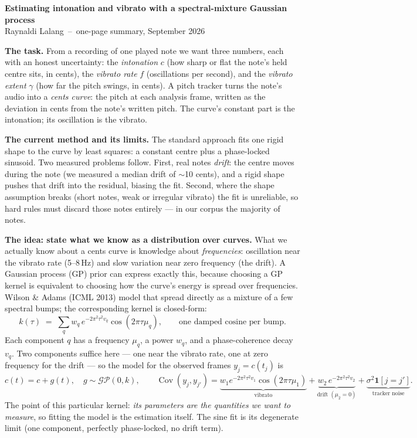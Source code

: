 \documentclass[10pt,a4paper]{article}
\begin{document}
\begin{center}
{\large\bfseries Estimating intonation and vibrato with a spectral-mixture Gaussian process}\\[2pt]
{\small Raynaldi Lalang \,--\, one-page summary, September 2026}
\end{center}

\textbf{The task.}
From a recording of one played note we want three numbers, each with an honest
uncertainty: the \emph{intonation} $c$ (how sharp or flat the note's held centre
sits, in cents), the \emph{vibrato rate} $f$ (oscillations per second), and the
\emph{vibrato extent} $\gamma$ (how far the pitch swings, in cents). A pitch
tracker turns the note's audio into a \emph{cents curve}: the pitch at each
analysis frame, written as the deviation in cents from the note's written pitch.
The curve's constant part is the intonation; its oscillation is the vibrato.

\textbf{The current method and its limits.}
The standard approach fits one rigid shape to the curve by least squares: a
constant centre plus a phase-locked sinusoid. Two measured problems follow.
First, real notes \emph{drift}: the centre moves during the note (we measured a
median drift of $\sim$10 cents), and a rigid shape pushes that drift into the
residual, biasing the fit. Second, where the shape assumption breaks (short
notes, weak or irregular vibrato) the fit is unreliable, so hard rules must
discard those notes entirely --- in our corpus the majority of notes.

\textbf{The idea: state what we know as a distribution over curves.}
What we actually know about a cents curve is knowledge about \emph{frequencies}:
oscillation near the vibrato rate (5--8\,Hz) and slow variation near zero
frequency (the drift). A Gaussian process (GP) prior can express exactly this,
because choosing a GP kernel is equivalent to choosing how the curve's energy is
spread over frequencies. Wilson \& Adams (ICML 2013) model that spread directly
as a mixture of a few spectral bumps; the corresponding kernel is closed-form:
\begin{equation*}
k(\tau) \;=\; \textstyle\sum_{q} w_q\, e^{-2\pi^2 \tau^2 v_q} \cos(2\pi \tau \mu_q),
\qquad
\text{one damped cosine per bump.}
\end{equation*}
Each component $q$ has a frequency $\mu_q$, a power $w_q$, and a phase-coherence
decay $v_q$. Two components suffice here --- one near the vibrato rate, one at
zero frequency for the drift --- so the model for the observed frames
$y_j = c(t_j)$ is
\begin{equation*}
c(t) = c + g(t), \quad g \sim \mathcal{GP}(0, k), \qquad
\operatorname{Cov}(y_j, y_{j'}) =
\underbrace{w_1 e^{-2\pi^2\tau^2 v_1}\cos(2\pi\tau\mu_1)}_{\text{vibrato}}
+ \underbrace{w_2\, e^{-2\pi^2\tau^2 v_2}}_{\text{drift }(\mu_2=0)}
+ \underbrace{\sigma^2 \mathbf{1}[j{=}j']}_{\text{tracker noise}}.
\end{equation*}
The point of this particular kernel: \emph{its parameters are the quantities we
want to measure}, so fitting the model is the estimation itself. The sine fit is
its degenerate limit (one component, perfectly phase-locked, no drift term).
\end{document}
